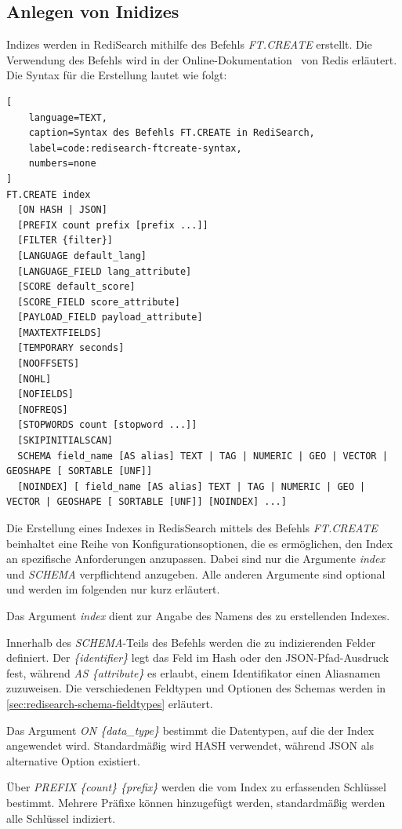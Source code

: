 \subsection{Anlegen von Inidizes}
Indizes werden in RediSearch mithilfe des Befehls \emph{FT.CREATE} erstellt.
Die Verwendung des Befehls wird in der Online-Dokumentation~\cite{redis_ltd_ftcreate_nodate} von Redis erläutert.
Die Syntax für die Erstellung lautet wie folgt:
\begin{lstlisting}[
    language=TEXT,
    caption=Syntax des Befehls FT.CREATE in RediSearch,
    label=code:redisearch-ftcreate-syntax,
    numbers=none
]
FT.CREATE index 
  [ON HASH | JSON] 
  [PREFIX count prefix [prefix ...]] 
  [FILTER {filter}]
  [LANGUAGE default_lang] 
  [LANGUAGE_FIELD lang_attribute] 
  [SCORE default_score] 
  [SCORE_FIELD score_attribute] 
  [PAYLOAD_FIELD payload_attribute] 
  [MAXTEXTFIELDS] 
  [TEMPORARY seconds] 
  [NOOFFSETS] 
  [NOHL] 
  [NOFIELDS] 
  [NOFREQS] 
  [STOPWORDS count [stopword ...]] 
  [SKIPINITIALSCAN]
  SCHEMA field_name [AS alias] TEXT | TAG | NUMERIC | GEO | VECTOR | GEOSHAPE [ SORTABLE [UNF]] 
  [NOINDEX] [ field_name [AS alias] TEXT | TAG | NUMERIC | GEO | VECTOR | GEOSHAPE [ SORTABLE [UNF]] [NOINDEX] ...]
\end{lstlisting}

Die Erstellung eines Indexes in RedisSearch mittels des Befehls \emph{FT.CREATE} beinhaltet eine Reihe von Konfigurationsoptionen, die es ermöglichen, den Index an spezifische Anforderungen anzupassen.
Dabei sind nur die Argumente \emph{index} und \emph{SCHEMA} verpflichtend anzugeben. Alle anderen Argumente sind optional und werden im folgenden nur kurz erläutert.

Das Argument \emph{index} dient zur Angabe des Namens des zu erstellenden Indexes.

Innerhalb des \emph{SCHEMA}-Teils des Befehls werden die zu indizierenden Felder definiert. Der \emph{\{identifier\}} legt das Feld im Hash oder den JSON-Pfad-Ausdruck fest, während \emph{AS \{attribute\}} es erlaubt, einem Identifikator einen Aliasnamen zuzuweisen. Die verschiedenen Feldtypen und Optionen des Schemas werden in \ref{sec:redisearch-schema-fieldtypes} erläutert.


Das Argument \emph{ON \{data\_type\}} bestimmt die Datentypen, auf die der Index angewendet wird. Standardmäßig wird HASH verwendet, während JSON als alternative Option existiert.

Über \emph{PREFIX \{count\} \{prefix\}} werden die vom Index zu erfassenden Schlüssel bestimmt. Mehrere Präfixe können hinzugefügt werden, standardmäßig werden alle Schlüssel indiziert.

